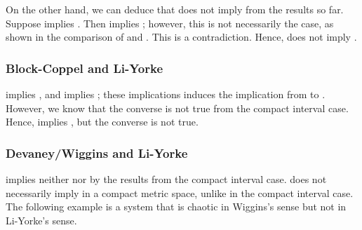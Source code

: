 \documentclass[10pt,twoside,draft]{book}
\begin{document}
On the other hand, we can deduce that \dev does not imply \blcp from the results so far.
Suppose \dev implies \blcp.
Then \dev implies \akm; however, this is not necessarily the case, as shown in the comparison of \dev and \akm.
This is a contradiction. 
Hence, \dev does not imply \blcp.

\subsubsection*{Block-Coppel and Li-Yorke}
\blcp implies \akm, and \akm implies \liy; these implications induces the implication from \blcp to \liy.
However, we know that the converse is not true from the compact interval case.
Hence, \blcp implies \liy, but the converse is not true.

\subsubsection*{Devaney/Wiggins and Li-Yorke}
\liy implies neither \dev nor \wig by the results from the compact interval case.
\wig does not necessarily imply \liy in a compact metric space, unlike in the compact interval case.
The following example is a system that is chaotic in Wiggins's sense but not in Li-Yorke's sense.
\end{document}
